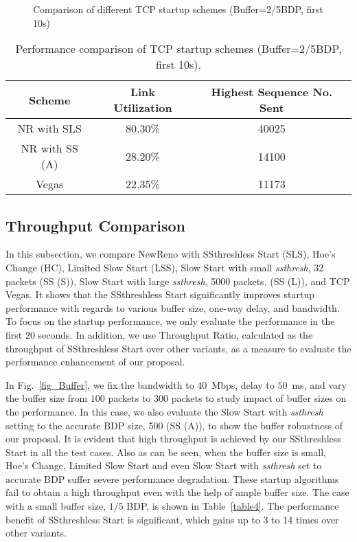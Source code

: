\documentclass[12pt,onecolumn]{IEEEtran}
\begin{document}
\begin{figure}[t]
 \centering
  \centering
  \caption{Comparison of different TCP startup schemes (Buffer=2/5BDP, first 10s)}
\label{three}
\end{figure}
\begin{table}[h]
\centering
\caption{\footnotesize Performance comparison of TCP startup schemes (Buffer=2/5BDP, first 10s).} \begin{tabular}{|c|c|c|} \hline
Scheme & Link Utilization & Highest Sequence No. Sent\\ \hline \hline
NR with SLS & 80.30\%   & 40025 \\ \hline NR with SS (A) & 28.20\%  & 14100   \\ \hline
Vegas & 22.35\%   & 11173 \\ \hline
\end{tabular}
\label{threetable}
\end{table}

\subsection{Throughput Comparison}

In this subsection, we compare NewReno with SSthreshless Start (SLS), Hoe's
Change (HC), Limited Slow Start (LSS), Slow Start with small \emph{ssthresh}, $32$ packets (SS (S)),
Slow Start with large \emph{ssthresh}, 5000 packets, (SS (L)), and TCP
Vegas. It shows that the SSthreshless Start significantly improves startup
performance with regards to various buffer size, one-way delay, and bandwidth.
To focus on the startup performance, we only evaluate the performance in the
first $20$ seconds. In addition, we use Throughput Ratio, calculated as the
throughput of SSthreshless Start over other variants, as a measure to evaluate
the performance enhancement of our proposal.

In Fig.~\ref{fig_Buffer}, we fix the bandwidth to $40$~Mbps, delay to $50$~ms,
and vary the buffer size from $100$ packets to $300$ packets to study impact of
buffer sizes on the performance. In this case, we also evaluate the Slow Start
with \emph{ssthresh} setting to the accurate BDP
size, 500 (SS (A)), to show the buffer robustness of our proposal. It is
evident that high throughput is achieved by our SSthreshless Start in all the
test cases. Also as can be seen, when the buffer size is small, Hoe's Change,
Limited Slow Start and even Slow Start with \emph{ssthresh} set to accurate BDP
suffer severe performance degradation. These startup algorithms fail to obtain
a high throughput even with the help of ample buffer size. The case with a
small buffer size, $1/5$ BDP, is shown in Table~\ref{table4}. The performance
benefit of SSthreshless Start is significant, which gains up to 3 to 14 times
over other variants.
\end{document}
